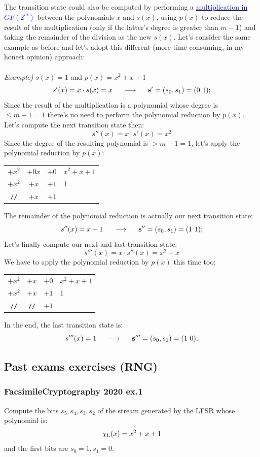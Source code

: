 \documentclass[11pt, a4paper]{article}
\newcommand{\consegue}{\hspace{0.5cm}\longrightarrow\hspace{0.5cm}}
\begin{document}
\newpage\hfill\break
The transition state could also be computed by performing a \hyperlink{multGF}{\textcolor{blue}{multiplication in $GF(2^m)$}} between the polynomials $x$ and $s(x)$, using $p(x)$ to reduce the result of the multiplication (only if the latter's degree is greater than $m-1$) and taking the remainder of the division as the new $s(x)$. Let's consider the same example as before and let's adopt this different (more time consuming, in my honest opinion) approach:\\\\
\textit{Example)} $s(x)=1$ and $p(x)=x^2+x+1$
$$s'(x)=x\cdot s(x)=x\consegue \textbf{s}'=(s_0,s_1)=(0\ 1);$$
Since the result of the multiplication is a polynomial whose degree is $\le m-1=1$ there's no need to perform the polynomial reduction by $p(x)$. Let's compute the next transition state then:
$$s''(x)=x\cdot s'(x)=x^2$$
Since the degree of the resulting polynomial is $>m-1=1$, let's apply the polynomial reduction by $p(x)$:
\begin{center}
    \begin{tabular}{ccc|l}
         $+x^2$&$+0x$&$+0$&$x^2+x+1$\\
         \cline{4-4}
         $+x^2$&$+x$&$+1$&1\\
         \cline{1-3}
         \texttt{//}&$+x$&$+1$&
    \end{tabular}
\end{center}
The remainder of the polynomial reduction is actually our next transition state:
$$s''(x)=x+1\consegue\textbf{s}''=(s_0,s_1)=(1\ 1);$$
Let's finally compute our next and last transition state:
$$s'''(x)=x\cdot s''(x)=x^2+x$$
We have to apply the polynomial reduction by $p(x)$ this time too:
\begin{center}
    \begin{tabular}{ccc|l}
         $+x^2$&$+x$&$+0$&$x^2+x+1$\\
         \cline{4-4}
         $+x^2$&$+x$&$+1$&1\\
         \cline{1-3}
         \texttt{//}&\texttt{//}&$+1$&
    \end{tabular}
\end{center}
In the end, the last transition state is:
$$s'''(x)=1\consegue \textbf{s}'''=(s_0,s_1)=(1\ 0);$$
\newpage
\subsection{Past exams exercises (RNG)}

\subsubsection{FacsimileCryptography 2020 ex.1}
Compute the bits $s_5,s_4,s_3,s_2$ of the stream generated by the LFSR whose polynomial is:
$$\chi_{\text L}(x)= x^2+x+1$$
and the first bits are $s_0=1, s_1=0$.
\end{document}
